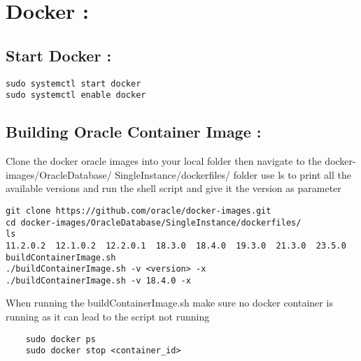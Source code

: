 \documentclass{article}
\begin{document}
\vspace{0.25cm}
\section{Docker : }
\subsection{Start Docker :}

\vspace{0.25cm}
\begin{tcolorbox}[title = starting docker]
\begin{verbatim}
sudo systemctl start docker
sudo systemctl enable docker
\end{verbatim}
\end{tcolorbox}

\vspace{0.25cm}
\subsection{Building Oracle Container Image :}

\vspace{0.25cm}
\begin{tcolorbox}[title = Pulling oracle-xe]
Clone the docker oracle images into your local folder then navigate to the docker-images/OracleDatabase/
SingleInstance/dockerfiles/
folder use ls to print all the available versions and run the shell script and give it the version as parameter
\begin{verbatim}
git clone https://github.com/oracle/docker-images.git
cd docker-images/OracleDatabase/SingleInstance/dockerfiles/
ls
11.2.0.2  12.1.0.2  12.2.0.1  18.3.0  18.4.0  19.3.0  21.3.0  23.5.0  buildContainerImage.sh
./buildContainerImage.sh -v <version> -x
./buildContainerImage.sh -v 18.4.0 -x 
\end{verbatim}

\end{tcolorbox}

\vspace{0.5cm}
\begin{tcolorbox}[title = Note]
When running the buildContainerImage.sh make sure no docker container is running as it can lead to the script
not running 
\begin{verbatim}
    sudo docker ps 
    sudo docker stop <container_id>
\end{verbatim}
\end{tcolorbox}
\end{document}

